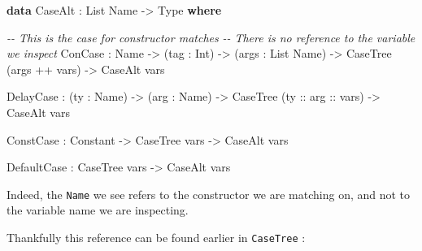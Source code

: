 \documentclass[
]{article}
\newenvironment{Shaded}{}{}
\newcommand{\CommentTok}[1]{\textcolor[rgb]{0.38,0.63,0.69}{\textit{#1}}}
\newcommand{\DataTypeTok}[1]{\textcolor[rgb]{0.56,0.13,0.00}{#1}}
\newcommand{\KeywordTok}[1]{\textcolor[rgb]{0.00,0.44,0.13}{\textbf{#1}}}
\newcommand{\NormalTok}[1]{#1}
\newcommand{\OperatorTok}[1]{\textcolor[rgb]{0.40,0.40,0.40}{#1}}
\newcommand{\OtherTok}[1]{\textcolor[rgb]{0.00,0.44,0.13}{#1}}
\begin{document}
\begin{Shaded}
\begin{Highlighting}[]
\KeywordTok{data} \DataTypeTok{CaseAlt} \OperatorTok{:} \DataTypeTok{List} \DataTypeTok{Name} \OtherTok{{-}\textgreater{}} \DataTypeTok{Type} \KeywordTok{where}

       \CommentTok{{-}{-} This is the case for constructor matches}
       \CommentTok{{-}{-} There is no reference to the variable we inspect}
       \DataTypeTok{ConCase} \OperatorTok{:} \DataTypeTok{Name} \OtherTok{{-}\textgreater{}}\NormalTok{ (tag }\OperatorTok{:} \DataTypeTok{Int}\NormalTok{) }\OtherTok{{-}\textgreater{}}\NormalTok{ (args }\OperatorTok{:} \DataTypeTok{List} \DataTypeTok{Name}\NormalTok{) }\OtherTok{{-}\textgreater{}}
                 \DataTypeTok{CaseTree}\NormalTok{ (args }\OperatorTok{++}\NormalTok{ vars) }\OtherTok{{-}\textgreater{}} \DataTypeTok{CaseAlt}\NormalTok{ vars}

       \DataTypeTok{DelayCase} \OperatorTok{:}\NormalTok{ (ty }\OperatorTok{:} \DataTypeTok{Name}\NormalTok{) }\OtherTok{{-}\textgreater{}}\NormalTok{ (arg }\OperatorTok{:} \DataTypeTok{Name}\NormalTok{) }\OtherTok{{-}\textgreater{}}
                   \DataTypeTok{CaseTree}\NormalTok{ (}\OtherTok{ty :: arg ::}\NormalTok{ vars) }\OtherTok{{-}\textgreater{}} \DataTypeTok{CaseAlt}\NormalTok{ vars}

       \DataTypeTok{ConstCase} \OperatorTok{:} \DataTypeTok{Constant} \OtherTok{{-}\textgreater{}} \DataTypeTok{CaseTree}\NormalTok{ vars }\OtherTok{{-}\textgreater{}} \DataTypeTok{CaseAlt}\NormalTok{ vars}

       \DataTypeTok{DefaultCase} \OperatorTok{:} \DataTypeTok{CaseTree}\NormalTok{ vars }\OtherTok{{-}\textgreater{}} \DataTypeTok{CaseAlt}\NormalTok{ vars}
\end{Highlighting}
\end{Shaded}

Indeed, the \texttt{Name} we see refers to the constructor we are
matching on, and not to the variable name we are inspecting.

Thankfully this reference can be found earlier in \texttt{CaseTree} :
\end{document}
